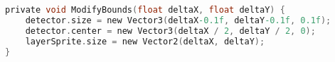 \begin{lstlisting}[language={C},label=lst:drag_update,caption={Metoda \texttt{DragUpdate} używana w narzędziach obszarowych}]
private void ModifyBounds(float deltaX, float deltaY) {
    detector.size = new Vector3(deltaX-0.1f, deltaY-0.1f, 0.1f);
    detector.center = new Vector3(deltaX / 2, deltaY / 2, 0);
    layerSprite.size = new Vector2(deltaX, deltaY);
}
\end{lstlisting}